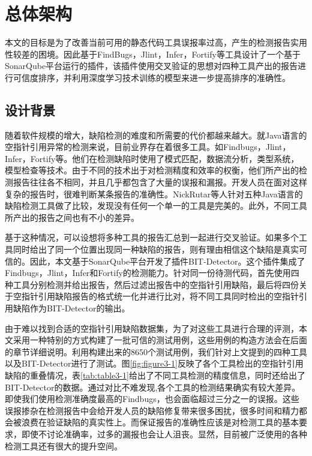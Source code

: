 \chapter{总体架构}

本文的目标是为了改善当前可用的静态代码工具误报率过高，产生的检测报告实用性较差的困境。因此基于FindBugs，Jlint，Infer，Fortify等工具设计了一个基于SonarQube平台运行的插件，该插件使用交叉验证的思想对四种工具产出的报告进行可信度排序，并利用深度学习技术训练的模型来进一步提高排序的准确性。

\section{设计背景}
随着软件规模的增大，缺陷检测的难度和所需要的代价都越来越大。就Java语言的空指针引用异常的检测来说，目前业界存在着很多工具。如Findbugs，Jlint，Infer，Fortify等。他们在检测缺陷时使用了模式匹配，数据流分析，类型系统，模型检查等技术。由于不同的技术出于对检测精度和效率的权衡，他们所产出的检测报告往往各不相同，并且几乎都包含了大量的误报和漏报。开发人员在面对这样复杂的报告时，很难判断某条报告的准确性。NickRutar\cite{rutar2004comparison}等人针对五种Java语言的缺陷检测工具做了比较，发现没有任何一个单一的工具是完美的。此外，不同工具所产出的报告之间也有不小的差异。

基于这种情况，可以设想将多种工具的报告汇总到一起进行交叉验证。如果多个工具同时给出了同一个位置出现同一种缺陷的报告，则有理由相信这个缺陷是真实可信的。因此，本文基于SonarQube平台开发了插件BIT-Detector。这个插件集成了Findbugs，Jlint，Infer和Fortify的检测能力。针对同一份待测代码，首先使用四种工具分别检测并给出报告，然后过滤出报告中的空指针引用缺陷，最后将四份关于空指针引用缺陷报告的格式统一化并进行比对，将不同工具同时检出的空指针引用缺陷作为BIT-Detector的输出。

由于难以找到合适的空指针引用缺陷数据集，为了对这些工具进行合理的评测，本文采用一种特别的方式构建了一批可信的测试用例，这些用例的构造方法会在后面的章节详细说明。利用构建出来的8650个测试用例，我们针对上文提到的四种工具以及BIT-Detector进行了测试。图\ref{fig:figure3-1}反映了各个工具检出的空指针引用缺陷的重叠情况，表\ref{tab:table3-1}给出了不同工具检测的精度信息，同时还给出了BIT-Detector的数据。通过对比不难发现,各个工具的检测结果确实有较大差异。即使我们使用检测准确度最高的Findbugs，也会面临超过三分之一的误报。这些误报掺杂在检测报告中会给开发人员的缺陷修复带来很多困扰，很多时间和精力都会被浪费在验证缺陷的真实性上。而保证报告的准确性应该是对检测工具的基本要求，即使不讨论准确率，过多的漏报也会让人沮丧。显然，目前被广泛使用的各种检测工具还有很大的提升空间。

